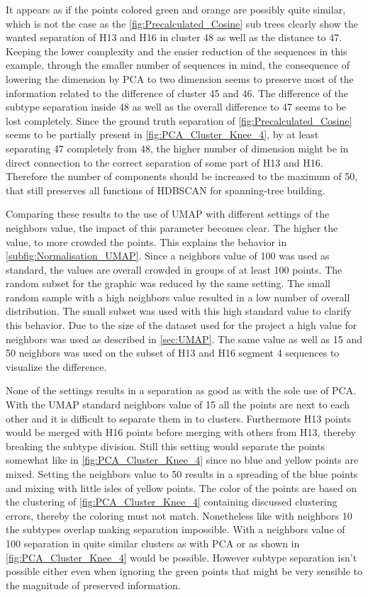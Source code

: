 It appears as if the points colored green and orange are possibly quite similar, which is not the case as the \autoref{fig:Precalculated_Cosine} sub trees clearly show the wanted separation of H13 and H16 in cluster 48 as well as the distance to 47. Keeping the lower complexity and the easier reduction of the sequences in this example, through the smaller number of sequences in mind, the consequence of lowering the dimension by \gls{PCA} to two dimension seems to preserve most of the information related to the difference of cluster 45 and 46. The difference of the subtype separation inside 48 as well as the overall difference to 47 seems to be lost completely. Since the ground truth separation of \autoref{fig:Precalculated_Cosine} seems to be partially present in \autoref{fig:PCA_Cluster_Knee_4}, by at least separating 47 completely from 48, the higher number of dimension might be in direct connection to the correct separation of some part of H13 and H16. Therefore the number of components should be increased to the maximum of 50, that still preserves all functions of \gls{HDBSCAN} for spanning-tree building. 

Comparing these results to the use of \gls{UMAP} with different settings of the neighbors value, the impact of this parameter becomes clear. The higher the value, to more crowded the points. This explains the behavior in \autoref{subfig:Normalisation_UMAP}. Since a neighbors value of 100 was used as standard, the values are overall crowded in groups of at least 100 points. The random subset for the graphic was reduced by the same setting. The small random sample with a high neighbors value resulted in a low number of overall distribution. The small subset was used with this high standard value to clarify this behavior. Due to the size of the dataset used for the project a high value for neighbors was used as described in \autoref{sec:UMAP}. The same value as well as 15 and 50 neighbors was used on the subset of H13 and H16 segment 4 sequences to visualize the difference. 

None of the settings results in a separation as good as with the sole use of \gls{PCA}. With the \gls{UMAP} standard neighbors value of 15 all the points are next to each other and it is difficult to separate them in to clusters. Furthermore H13 points would be merged with H16 points before merging with others from H13, thereby breaking the subtype division. Still this setting would separate the points somewhat like in \autoref{fig:PCA_Cluster_Knee_4} since no blue and yellow points are mixed. Setting the neighbors value to 50 results in a spreading of the blue points and mixing with little isles of yellow points. The color of the points are based on the clustering of \autoref{fig:PCA_Cluster_Knee_4} containing discussed clustering errors, thereby the coloring must not match. Nonetheless like with neighbors 10 the subtypes overlap making separation impossible. With a neighbors value of 100 separation in quite similar clusters as with \gls{PCA} or as shown in \autoref{fig:PCA_Cluster_Knee_4} would be possible. However subtype separation isn't possible either even when ignoring the green points that might be very sensible to the magnitude of preserved information.

